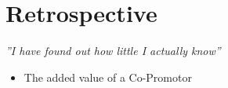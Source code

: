 \chapter{Retrospective}
\label{ch:retrospective}

\begin{center}
\textit{''I have found out how little I actually know''}
\end{center}

\begin{itemize}
	\item{The added value of a Co-Promotor}
\end{itemize}